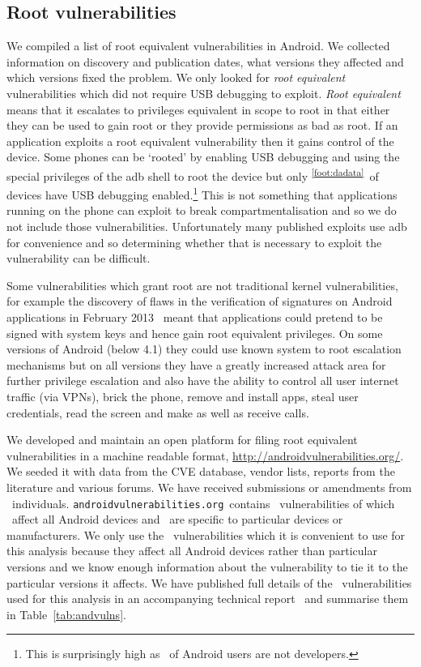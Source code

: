 \documentclass[conference,a4paper,twoside]{IEEEtran}
\let\OldTodo\todo
\renewcommand{\todo}{\OldTodo[inline]}
\newcommand{\dafoot}{\textsuperscript{\ref{foot:dadata}}}
\newcommand{\avo}{\texttt{androidvulnerabilities.org}}
\begin{document}
\subsection{Root vulnerabilities}
We compiled a list of root equivalent vulnerabilities in Android.
We collected information on discovery and publication dates, what versions they affected and which versions fixed the problem.
We only looked for \emph{root equivalent} vulnerabilities which did not require USB debugging to exploit.
\emph{Root equivalent} means that it escalates to privileges equivalent in scope to root in that either they can be used to gain root or they provide permissions as bad as root.
If an application exploits a root equivalent vulnerability then it gains control of the device.
Some phones can be `rooted' by enabling USB debugging and using the special privileges of the adb shell to root the device but only \daAdbEnabledPerc\dafoot\ of devices have USB debugging enabled.\footnote{This is surprisingly high as \daAdbEnabledPerc\ of Android users are not developers.}
This is not something that applications running on the phone can exploit to break compartmentalisation and so we do not include those vulnerabilities.
Unfortunately many published exploits use adb for convenience and so determining whether that is necessary to exploit the vulnerability can be difficult.

Some vulnerabilities which grant root are not traditional kernel vulnerabilities, for example the discovery of flaws in the verification of signatures on Android applications in February 2013~\cite{Forristal2013} meant that applications could pretend to be signed with system keys and hence gain root equivalent privileges.
On some versions of Android (below 4.1) they could use known system to root escalation mechanisms but on all versions they have a greatly increased attack area for further privilege escalation and also have the ability to control all user internet traffic (via VPNs), brick the phone, remove and install apps, steal user credentials, read the screen and make as well as receive calls.
\todo{break vulnerabilities down by attack vector?}
\avoTabAndVulns

We developed and maintain an open platform for filing root equivalent vulnerabilities in a machine readable format, \url{http://androidvulnerabilities.org/}.
We seeded it with data from the CVE database, vendor lists, reports from the literature and various forums.
We have received submissions or amendments from \avoNumSubmitters\ individuals.
\avo\ contains \avoNumVulnerabilities\ vulnerabilities of which \avoNumVulnAllAndroid\ affect all Android devices and \avoNumVulnSpecific\ are specific to particular devices or manufacturers.
We only use the \daNumVulnsUsed\ vulnerabilities which it is convenient to use for this analysis because they affect all Android devices rather than particular versions and we know enough information about the vulnerability to tie it to the particular versions it affects.
We have published full details of the \daNumVulnsUsed\ vulnerabilities used for this analysis in an accompanying technical report~\cite{TODO} and summarise them in Table~\ref{tab:andvulns}.
\end{document}
